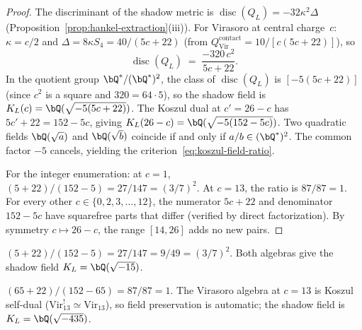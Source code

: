 \begin{proof}
The discriminant of the shadow metric is
$\operatorname{disc}(Q_L) = -32\kappa^2\Delta$
\textup{(}Proposition~\textup{\ref{prop:hankel-extraction}(iii)}\textup{)}.
For Virasoro at central charge~$c$:
$\kappa = c/2$ and
$\Delta = 8\kappa S_4 = 40/(5c + 22)$
\textup{(}from $Q^{\mathrm{contact}}_{\mathrm{Vir}}
= 10/[c(5c+22)]$\textup{)},
so
\[
 \operatorname{disc}(Q_L)
 \;=\;
 \frac{-320\,c^2}{5c + 22}.
\]
In the quotient group $\bQ^*/(\bQ^*)^2$,
the class of $\operatorname{disc}(Q_L)$ is
$[-5(5c+22)]$
\textup{(}since $c^2$ is a square and
$320 = 64 \cdot 5$\textup{)},
so the shadow field is
$K_L(c) = \bQ(\sqrt{-5(5c+22)})$.
The Koszul dual at $c' = 26 - c$ has $5c' + 22 = 152 - 5c$,
giving $K_L(26-c) = \bQ(\sqrt{-5(152-5c)})$.
Two quadratic fields $\bQ(\sqrt{a})$ and $\bQ(\sqrt{b})$
coincide if and only if $a/b \in (\bQ^*)^2$.
The common factor $-5$ cancels, yielding the
criterion~\eqref{eq:koszul-field-ratio}.

For the integer enumeration: at $c = 1$,
$(5 + 22)/(152 - 5) = 27/147 = (3/7)^2$.
At $c = 13$, the ratio is $87/87 = 1$.
For every other $c \in \{0, 2, 3, \ldots, 12\}$,
the numerator $5c + 22$ and denominator $152 - 5c$
have squarefree parts that differ
\textup{(}verified by direct factorization\textup{)}.
By symmetry $c \mapsto 26 - c$, the range $[14, 26]$
adds no new pairs.
\end{proof}

\begin{example}[The pair $c = 1$, $c = 25$]
\label{ex:koszul-field-1-25}
$(5 + 22)/(152 - 5) = 27/147 = 9/49 = (3/7)^2$.
Both algebras give the shadow field
$K_L = \bQ(\sqrt{-15})$.
\end{example}

\begin{example}[The self-dual point $c = 13$]
\label{ex:koszul-field-13}
$(65 + 22)/(152 - 65) = 87/87 = 1$.
The Virasoro algebra at $c = 13$ is Koszul self-dual
\textup{(}$\mathrm{Vir}_{13}^! \simeq \mathrm{Vir}_{13}$\textup{)},
so field preservation is automatic; the shadow field is
$K_L = \bQ(\sqrt{-435})$.
\end{example}


